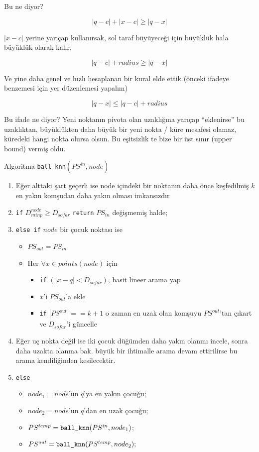 \documentclass[12pt,fleqn]{article}\usepackage{../../common}
\begin{document}
Bu ne diyor? 

$$ |q-c| + |x-c| \ge |q-x| $$

$|x-c|$ yerine yarıçap kullanırsak, sol taraf büyüyeceği için büyüklük hala
büyüklük olarak kalır, 

$$ |q-c| + radius \ge |q-x| $$

Ve yine daha genel ve hızlı hesaplanan bir kural elde ettik (önceki
ifadeye benzemesi için yer düzenlemesi yapalım)

$$ |q-x| \le |q-c| + radius $$

Bu ifade ne diyor? Yeni noktanın pivota olan uzaklığına yarıçap
``eklenirse'' bu uzaklıktan, büyüklükten daha büyük bir yeni nokta / küre
 mesafesi olamaz, küredeki hangi nokta olursa olsun. Bu eşitsizlik te bize
 bir üst sınır (upper bound) vermiş oldu. 

Algoritma \verb!ball_knn!$\left(PS^{in},node\right)$
\begin{enumerate}

\item Eğer alttaki şart geçerli ise node içindeki bir noktanın daha önce
  keşfedilmiş $k$ en yakın komşudan daha yakın olması imkansızdır

\item \verb!if! $D^{node}_{minp} \ge D_{sofar}$ \verb!return!  $PS_{in}$
  değişmemiş halde;

\item \verb!else if! $node$ bir çocuk noktası ise

  \begin{itemize}
   \item  $PS_{out} = PS_{in}$
   \item Her $\forall x \in points(node)$ için
   \begin{itemize}
     \item \verb!if! $\left( |x-q| < D_{sofar} \right)$, basit lineer arama yap
     \item $x$'i $PS_{out}$'a ekle
     \item \verb!if! $|PS^{out}| == k+1$ o zaman en uzak olan komşuyu
       $PS^{out}$'tan çıkart ve $D_{sofar}$'i güncelle
   \end{itemize}

  \end{itemize}

\item Eğer uç nokta değil ise iki çocuk düğümden daha yakın olanını
  incele, sonra daha uzakta olanına bak. büyük bir ihtimalle arama devam
  ettirilirse bu arama kendiliğinden kesilecektir.

  \item \verb!else!
    \begin{itemize}
      \item $node_1 = node$'un $q$'ya en yakın çocuğu;
      \item $node_2 = node$'un $q$'dan en uzak çocuğu;
      \item $PS^{temp} = \verb!ball_knn!(PS^{in},node_1)$;
      \item $PS^{out} = \verb!ball_knn!(PS^{temp},node_2);$
\end{itemize}
        
\end{enumerate}
\end{document}
